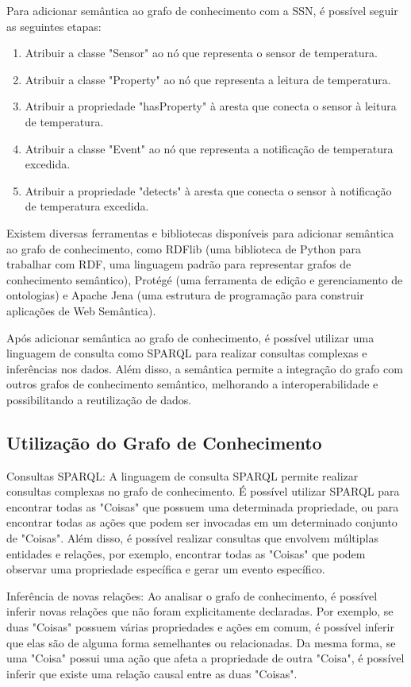 Para adicionar semântica ao grafo de conhecimento com a SSN, é possível seguir as seguintes etapas:

\begin{enumerate}
    \item Atribuir a classe "Sensor" ao nó que representa o sensor de temperatura.
    \item Atribuir a classe "Property" ao nó que representa a leitura de temperatura.
    \item Atribuir a propriedade "hasProperty" à aresta que conecta o sensor à leitura de temperatura.
    \item Atribuir a classe "Event" ao nó que representa a notificação de temperatura excedida.
    \item Atribuir a propriedade "detects" à aresta que conecta o sensor à notificação de temperatura excedida.
\end{enumerate}

Existem diversas ferramentas e bibliotecas disponíveis para adicionar semântica ao grafo de conhecimento, como RDFlib (uma biblioteca de Python para trabalhar com RDF, uma linguagem padrão para representar grafos de conhecimento semântico), Protégé (uma ferramenta de edição e gerenciamento de ontologias) e Apache Jena (uma estrutura de programação para construir aplicações de Web Semântica).

Após adicionar semântica ao grafo de conhecimento, é possível utilizar uma linguagem de consulta como SPARQL para realizar consultas complexas e inferências nos dados. Além disso, a semântica permite a integração do grafo com outros grafos de conhecimento semântico, melhorando a interoperabilidade e possibilitando a reutilização de dados.

\subsection{Utilização do Grafo de Conhecimento}

Consultas SPARQL: A linguagem de consulta SPARQL permite realizar consultas complexas no grafo de conhecimento. É possível utilizar SPARQL para encontrar todas as "Coisas" que possuem uma determinada propriedade, ou para encontrar todas as ações que podem ser invocadas em um determinado conjunto de "Coisas". Além disso, é possível realizar consultas que envolvem múltiplas entidades e relações, por exemplo, encontrar todas as "Coisas" que podem observar uma propriedade específica e gerar um evento específico.

Inferência de novas relações: Ao analisar o grafo de conhecimento, é possível inferir novas relações que não foram explicitamente declaradas. Por exemplo, se duas "Coisas" possuem várias propriedades e ações em comum, é possível inferir que elas são de alguma forma semelhantes ou relacionadas. Da mesma forma, se uma "Coisa" possui uma ação que afeta a propriedade de outra "Coisa", é possível inferir que existe uma relação causal entre as duas "Coisas".

